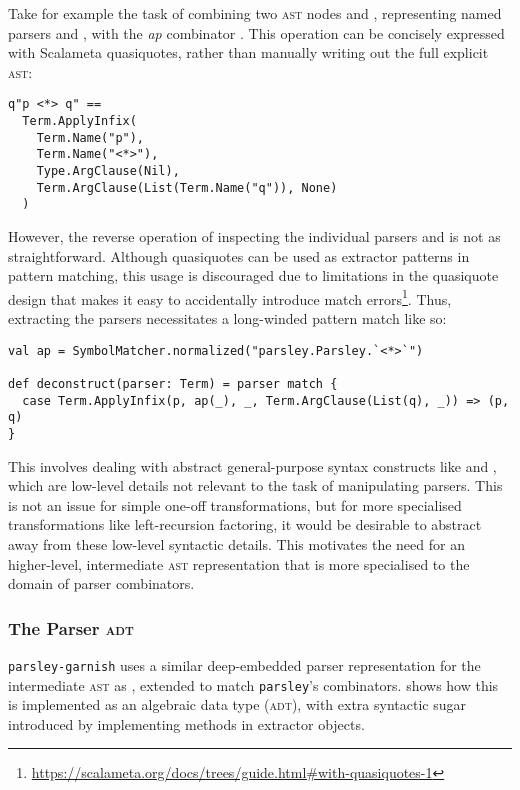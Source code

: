 \documentclass[../../main.tex]{subfiles}
\begin{document}
Take for example the task of combining two \textsc{ast} nodes  and , representing named parsers  and , with the \emph{ap} combinator \scala{<*>}.
This operation can be concisely expressed with Scalameta quasiquotes, rather than manually writing out the full explicit \textsc{ast}:
\begin{verbatim}
q"p <*> q" ==
  Term.ApplyInfix(
    Term.Name("p"),
    Term.Name("<*>"),
    Type.ArgClause(Nil),
    Term.ArgClause(List(Term.Name("q")), None)
  )
\end{verbatim}
However, the reverse operation of inspecting the individual parsers  and  is not as straightforward.
Although quasiquotes can be used as extractor patterns in pattern matching, this usage is discouraged due to limitations in the quasiquote design that makes it easy to accidentally introduce match errors\footnote{\url{https://scalameta.org/docs/trees/guide.html#with-quasiquotes-1}}.
Thus, extracting the parsers necessitates a long-winded pattern match like so:
\begin{verbatim}
val ap = SymbolMatcher.normalized("parsley.Parsley.`<*>`")

def deconstruct(parser: Term) = parser match {
  case Term.ApplyInfix(p, ap(_), _, Term.ArgClause(List(q), _)) => (p, q)
}
\end{verbatim}
This involves dealing with abstract general-purpose syntax constructs like  and , which are low-level details not relevant to the task of manipulating parsers.
This is not an issue for simple one-off transformations, but for more specialised transformations like left-recursion factoring, it would be desirable to abstract away from these low-level syntactic details.
This motivates the need for an higher-level, intermediate \textsc{ast} representation that is more specialised to the domain of parser combinators.

\subsubsection{The Parser \textsc{adt}}
\texttt{parsley-garnish} uses a similar deep-embedded parser representation for the intermediate \textsc{ast} as \textcite{baars_leftrec_2004}, extended to match \texttt{parsley}'s combinators.
 shows how this is implemented as an algebraic data type (\textsc{adt}), with extra syntactic sugar introduced by implementing  methods in extractor objects.
\end{document}
